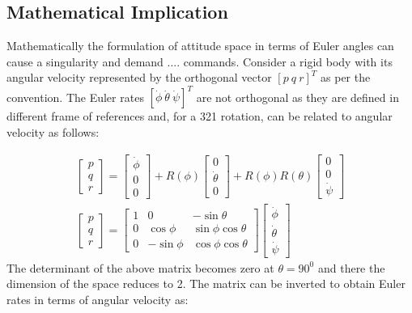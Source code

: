 \documentclass{article}
\begin{document}
\subsection{Mathematical Implication}
Mathematically the formulation of attitude space in terms of Euler angles can cause a singularity and demand .... commands. Consider a rigid body with its angular velocity represented by the orthogonal vector $[p~q~r]^T$ as per the convention. The Euler rates $[\dot{\phi} ~ \dot{\theta} ~ \dot{\psi}]^T$ are not orthogonal as they are defined in different frame of references and, for a 321 rotation, can be related to angular velocity as follows:

\begin{eqnarray}
		\begin{bmatrix}
		p\\q\\r \end{bmatrix} = \begin{bmatrix}
		\dot{\phi}\\0\\0
		\end{bmatrix}+ R(\phi)\begin{bmatrix}
		0\\\dot{\theta}\\0
		\end{bmatrix} + R(\phi)R(\theta)\begin{bmatrix}
		0\\0\\\dot{\psi}
		\end{bmatrix}\\
		\begin{bmatrix}
		p\\q\\r \end{bmatrix}  =  \begin{bmatrix}
		1 & 0 & -\sin\theta\\
		0& \cos\phi & \sin\phi\cos\theta\\
		0 & -\sin\phi & \cos\phi\cos\theta 
		\end{bmatrix}\begin{bmatrix}
		\dot{\phi}\\\dot{\theta} \\ \dot{\psi}
		\end{bmatrix}
\end{eqnarray}
The determinant of the above matrix becomes zero at $\theta=90^0$ and there the dimension of the space reduces to 2. The matrix can be inverted to obtain Euler rates in terms of angular velocity as:
\end{document}
